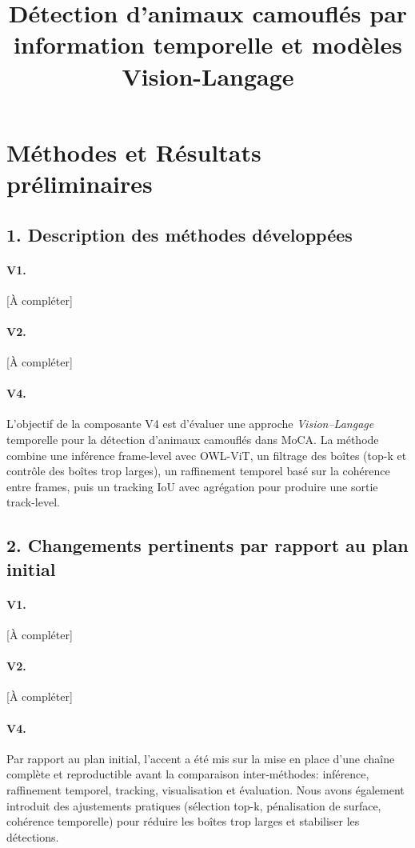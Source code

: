 \documentclass{article}
\title{Détection d’animaux camouflés par information temporelle et modèles Vision-Langage}
\begin{document}
\maketitle

\section{Méthodes et Résultats préliminaires}

\subsection{1. Description des méthodes développées}
\paragraph{V1.} [À compléter]

\paragraph{V2.} [À compléter]

\paragraph{V4.}
L’objectif de la composante V4 est d’évaluer une approche \textit{Vision--Langage} temporelle pour la détection d’animaux camouflés dans MoCA. La méthode combine une inférence frame-level avec OWL-ViT, un filtrage des boîtes (top-k et contrôle des boîtes trop larges), un raffinement temporel basé sur la cohérence entre frames, puis un tracking IoU avec agrégation pour produire une sortie track-level.

\subsection{2. Changements pertinents par rapport au plan initial}
\paragraph{V1.} [À compléter]

\paragraph{V2.} [À compléter]

\paragraph{V4.}
Par rapport au plan initial, l’accent a été mis sur la mise en place d’une chaîne complète et reproductible avant la comparaison inter-méthodes: inférence, raffinement temporel, tracking, visualisation et évaluation. Nous avons également introduit des ajustements pratiques (sélection top-k, pénalisation de surface, cohérence temporelle) pour réduire les boîtes trop larges et stabiliser les détections.
\end{document}
